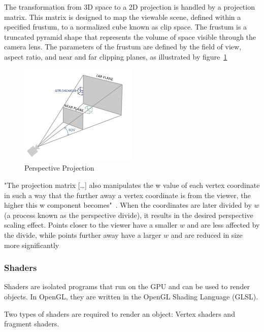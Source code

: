 The transformation from 3D space to a 2D projection is handled by a projection matrix.
This matrix is designed to map the viewable scene, defined within a specified frustum, to a normalized cube known as clip space.
The frustum is a truncated pyramid shape that represents the volume of space visible through the camera lens.
The parameters of the frustum are defined by the field of view, aspect ratio, and near and far clipping planes,
as illustrated by figure~\ref{fig:perspective}
\begin{figure}[h]
    \centering
    \includegraphics[width=0.50\textwidth]{images/perspective}
    \caption{Perspective Projection}
    \label{fig:perspective}
\end{figure}

"The projection matrix [\ldots] also manipulates the w value of each vertex coordinate in such a way
that the further away a vertex coordinate is from the viewer, the higher this w component becomes"~\parencite{de_vries_learn_2020}.
When the coordinates are later divided by $w$ (a process known as the perspective divide), %
it results in the desired perspective scaling effect.
Points closer to the viewer have a smaller $w$ and are less affected by the divide,
while points further away have a larger $w$ and are reduced in size more significantly

\subsubsection{Shaders}\label{subsec:shaders}
Shaders are isolated programs that run on the GPU and can be used to render objects.
In OpenGL, they are written in the OpenGL Shading Language (GLSL).

Two types of shaders are required to render an object: Vertex shaders and fragment shaders.

